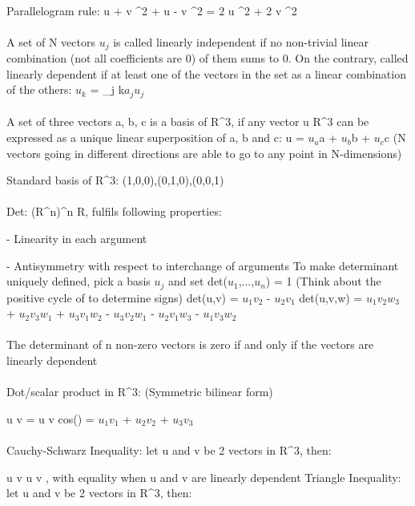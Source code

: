 \documentclass{article}
\begin{document}
\\
Parallelogram rule: \vert u + v \vert^2 + \vert u - v \vert^2 = 2 \vert u \vert^2 + 2 \vert v \vert^2\)
\\
\\
A set of N vectors {$u_j$} is called linearly independent if no non-trivial linear combination (not all coefficients are 0) of them sums to 0. On the contrary, called linearly dependent if at least one of the vectors in the set as a linear combination of the others: \math $u_k$ = \sum_{j \neq k}$a_j$$u_j$\)
\\
\\
A set of three vectors a, b, c is a basis of R^3\), if any vector \math u \in R^3\) can be expressed as a unique linear superposition of a, b and c: \math u = $u_a$a + $u_b$b + $u_c$c\) (N vectors going in different directions are able to go to any point in N-dimensions)

Standard basis of R^3: \math (1,0,0),(0,1,0),(0,0,1)   \)
\\
\\
\math Det: (R^n\))^n \rightarrow R\), fulfils following properties:

- Linearity in each argument 

- Antisymmetry with respect to interchange of arguments
\newline To make determinant uniquely defined, pick a basis {$u_j$} and set \math det($u_1$,...,$u_n$) = 1\)
\newline (Think about the positive cycle of    \) to determine signs)
\newline \math det(u,v) = $u_1$$v_2$ - $u_2$$v_1$\)
\newline \math det(u,v,w) = $u_1$$v_2$$w_3$ + $u_2$$v_3$$w_1$ + $u_3$$v_1$$w_2$ - $u_3$$v_2$$w_1$ - $u_2$$v_1$$w_3$ - $u_1$$v_3$$w_2$\)
\\
\\
The determinant of \math n\) non-zero vectors is zero if and only if the vectors are linearly dependent
\\
\\
Dot/scalar product in R^3\): (Symmetric bilinear form)

\math u \cdot v = \vert u \vert \vert v \vert cos(\phi) = $u_1$$v_1$ + $u_2$$v_2$ + $u_3$$v_3$\)
\\
\\
Cauchy-Schwarz Inequality: let u and v be 2 vectors in R^3\), then:

\math \vert u \cdot v \vert \leq \vert u \vert \vert v \vert\), with equality when u and v are linearly dependent
\newline Triangle Inequality: let u and v be 2 vectors in R^3\), then:
\end{document}

